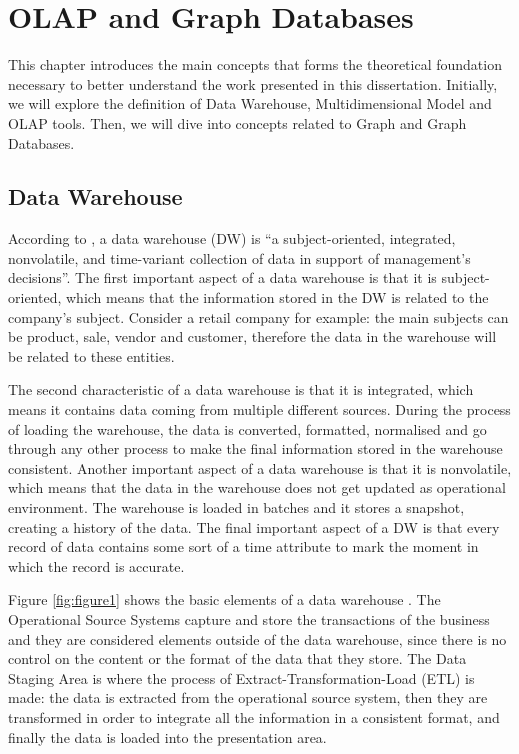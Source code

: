 \chapter{OLAP and Graph Databases}
This chapter introduces the main concepts that forms the theoretical foundation necessary to better understand the work presented in this dissertation. Initially, we will explore the definition of Data Warehouse, Multidimensional Model and OLAP tools. Then, we will dive into concepts related to Graph and Graph Databases.

\section{Data Warehouse}
According to \cite{Inmon2005}, a data warehouse (DW) is ``a subject-oriented, integrated, nonvolatile, and time-variant collection of data in support of management's decisions''. The first important aspect of a data warehouse is that it is subject-oriented, which means that the information stored in the DW is related to the company's subject. Consider a retail company for example: the main subjects can be product, sale, vendor and customer, therefore the data in the warehouse will be related to these entities.

The second characteristic of a data warehouse is that it is integrated, which means it contains data coming from multiple different sources. During the process of loading the warehouse, the data is converted, formatted, normalised and go through any other process to make the final information stored in the warehouse consistent. Another important aspect of a data warehouse is that it is nonvolatile, which means that the data in the warehouse does not get updated as operational environment. The warehouse is loaded in batches and it stores a snapshot, creating a history of the data. The final important aspect of a DW is that every record of data contains some sort of a time attribute to mark the moment in which the record is accurate.

Figure \ref{fig:figure1} shows the basic elements of a data warehouse \cite{Kimball2011}. The Operational Source Systems capture and store the transactions of the business and they are considered elements outside of the data warehouse, since there is no control on the content or the format of the data that they store. The Data Staging Area is where the process of Extract-Transformation-Load (ETL) is made: the data is extracted from the operational source system, then they are transformed in order to integrate all the information in a consistent format, and finally the data is loaded into the presentation area.

